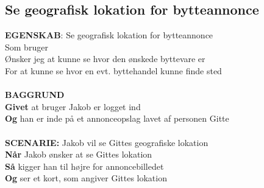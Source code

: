 \subsection{Se geografisk lokation for bytteannonce}
{\color{blue}\textbf{EGENSKAB}:} Se geografisk lokation for bytteannonce \\
Som bruger \\
Ønsker jeg at kunne se hvor den ønskede byttevare er \\
For at kunne se hvor en evt. byttehandel kunne finde sted\\ \\
{\color{blue}\textbf{BAGGRUND}} \\
{\color{blue}\textbf{Givet}} at bruger Jakob er logget ind \\
{\color{blue}\textbf{Og}} han er inde på et annonceopslag lavet af personen Gitte\\\\
{\color{blue}\textbf{SCENARIE:}} Jakob vil se Gittes geografiske lokation \\
{\color{blue}\textbf{Når}} Jakob ønsker at se Gittes lokation \\
{\color{blue}\textbf{Så}} kigger han til højre for annoncebilledet \\
{\color{blue}\textbf{Og}} ser et kort, som angiver Gittes lokation